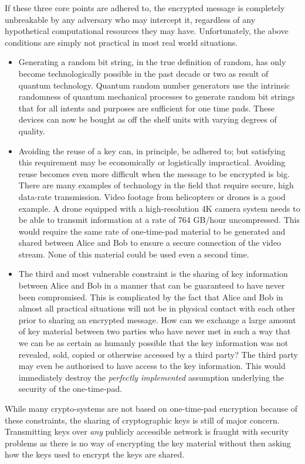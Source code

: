 \documentclass[twocolumn, aps, rmp, amsmath, amssymb, nofootinbib, superscriptaddress, longbibliography, floatfix, table-of-contents, eqsecnum]{revtex4-2}
\begin{document}
If these three core points are adhered to, the encrypted message is completely unbreakable by any adversary who may intercept it, regardless of any hypothetical computational resources they may have. Unfortunately, the above conditions are simply not practical in most real world situations. 
\begin{itemize}
\item Generating a random bit string, in the true definition of random, has only become technologically possible in the past decade or two as result of quantum technology. Quantum random number generators use the intrinsic randomness of quantum mechanical processes to generate random bit strings that for all intents and purposes are sufficient for one time pads. These devices can now be bought as off the shelf units with varying degrees of quality. 
\item Avoiding the reuse of a key can, in principle, be adhered to; but satisfying this requirement may be economically or logistically impractical. Avoiding reuse becomes even more difficult when the message to be encrypted is big. There are many examples of technology in the field that require secure, high data-rate transmission. Video footage from helicopters or drones is a good example. A drone equipped with a high-resolution 4K camera system needs to be able to transmit information at a rate of 764 GB/hour uncompressed. This would require the same rate of one-time-pad material to be generated and shared between Alice and Bob to ensure a secure connection of the video stream. None of this material could be used even a second time. 
\item The third and most vulnerable constraint is the sharing of key information between Alice and Bob in a manner that can be guaranteed to have never been compromised. This is complicated by the fact that Alice and Bob in almost all practical situations will not be in physical contact with each other prior to sharing an encrypted message. How can we exchange a large amount of key material between two parties who have never met in such a way that we can be as certain as humanly possible that the key information was not revealed, sold, copied or otherwise accessed by a third party? The third party may even be authorised to have access to the key information. This would immediately destroy the \textit{perfectly implemented} assumption underlying the security of the one-time-pad. 
\end{itemize}

While many crypto-systems are not based on one-time-pad encryption because of these constraints, the sharing of cryptographic keys is still of major concern. Transmitting keys over \textit{any} publicly accessible network is fraught with security problems as there is no way of encrypting the key material without then asking how the keys used to encrypt the keys are shared.
\end{document}
